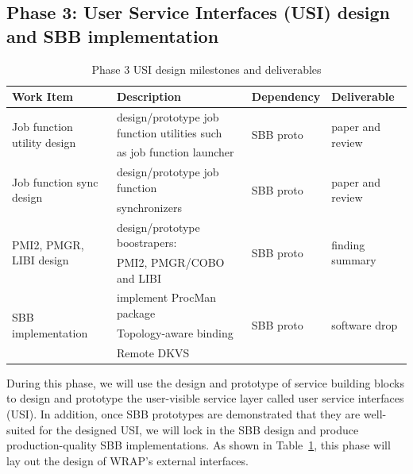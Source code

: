 \documentclass[10pt]{article}
\begin{document}
\subsection{Phase 3: User Service Interfaces (USI) design and SBB implementation} 
\begin{table}
\centering
\begin{tabular}{|l|l|l|l|}
\hline
Work Item & Description & Dependency & Deliverable \\
\hline
\multirow{2}{*}{Job function utility design} & design/prototype job function utilities such & \multirow{2}{*}{SBB proto} & \multirow{2}{*}{paper and review} \\
& as job function launcher & & \\ \hline
\multirow{2}{*}{Job function sync design} & design/prototype job function & \multirow{2}{*}{SBB proto} & \multirow{2}{*}{paper and review} \\
& synchronizers & & \\ \hline
\multirow{2}{*}{PMI2, PMGR, LIBI design} & design/prototype boostrapers: & \multirow{2}{*}{SBB proto} & \multirow{2}{*}{finding summary} \\
& PMI2, PMGR/COBO and LIBI & & \\ \hline
\multirow{3}{*}{SBB implementation} & implement ProcMan package & \multirow{3}{*}{SBB proto} & \multirow{3}{*}{software drop} \\
& Topology-aware binding & & \\ 
& Remote DKVS & & \\ \hline
\end{tabular}
\caption{Phase 3 USI design milestones and deliverables}
\label{tab:phase3}
\end{table}

During this phase, we will use the design and prototype of service building blocks
to design and prototype the user-visible service layer called user service interfaces (USI). 
In addition, once SBB prototypes are demonstrated that they are well-suited for the designed USI,
we will lock in the SBB design and produce production-quality SBB implementations. 
As shown in Table~\ref{tab:phase3},
this phase will lay out the design of WRAP's external interfaces. 
\end{document}
